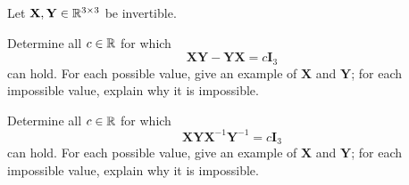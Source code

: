 \begin{problem}
Let $\mathbf X,\mathbf Y\in\mathbb{R}^{3\times3}$ be invertible.
\begin{problemsubparts}
\item Determine all $c\in\mathbb{R}$ for which
\[
\mathbf X\mathbf Y-\mathbf Y\mathbf X=c\mathbf I_3
\]
can hold. For each possible value, give an example of $\mathbf X$ and $\mathbf Y$; for each impossible value, explain why it is impossible.
\item Determine all $c\in\mathbb{R}$ for which
\[
\mathbf X\mathbf Y\mathbf X^{-1}\mathbf Y^{-1}=c\mathbf I_3
\]
can hold. For each possible value, give an example of $\mathbf X$ and $\mathbf Y$; for each impossible value, explain why it is impossible.
\end{problemsubparts}
\end{problem}

